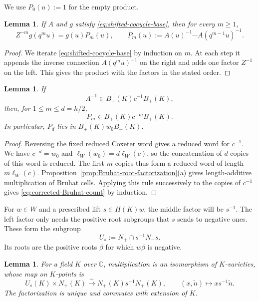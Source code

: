 \documentclass[11pt,leqno]{amsart}
\numberwithin{equation}{section}
\theoremstyle{plain}
\newtheorem{lemma}[theorem]{Lemma}
\theoremstyle{definition}
\theoremstyle{plain}
\theoremstyle{definition}
\theoremstyle{remark}
\begin{document}
We use $P_0(u):=1$ for the empty product.
\begin{lemma}\label{lem:shifted-cocycle-iteration}
If $A$ and $g$ satisfy \eqref{eq:shifted-cocycle-base}, then for every $m\ge1$,
\begin{equation}\label{eq:shifted-cocycle-corrected}
 Z^{-m}g(q^mu)
 =g(u)P_m(u),
 \qquad
 P_m(u):=A(u)^{-1}\cdots A(q^{m-1}u)^{-1}.
\end{equation}
\end{lemma}

\begin{proof}
We iterate \eqref{eq:shifted-cocycle-base} by induction on $m$.  At each step it appends the inverse connection $A(q^mu)^{-1}$ on the right and adds one factor $Z^{-1}$ on the left.  This gives the product with the factors in the stated order.
\end{proof}

\begin{lemma}\label{lem:corrected-Bruhat-count}
If
\[
 A^{-1}\in B_+(K)c^{-1}B_+(K),
\]
then, for $1\le m\le d=h/2$,
\begin{equation}\label{eq:corrected-Bruhat-count}
 P_m\in B_+(K)c^{-m}B_+(K).
\end{equation}
In particular, $P_d$ lies in $B_+(K)w_0B_+(K)$.
\end{lemma}

\begin{proof}
Reversing the fixed reduced Coxeter word gives a reduced word for $c^{-1}$.  We have $c^{-d}=w_0$ and $\ell_W(w_0)=d\ell_W(c)$, so the concatenation of $d$ copies of this word is reduced.  The first $m$ copies thus form a reduced word of length $m\ell_W(c)$.  Proposition~\ref{prop:Bruhat-root-factorization}(a) gives length-additive multiplication of Bruhat cells.  Applying this rule successively to the copies of $c^{-1}$ gives \eqref{eq:corrected-Bruhat-count} by induction.
\end{proof}

For $w\in W$ and a prescribed lift $s\in H(K)\dot w$, the middle factor will be $s^{-1}$.  The left factor only needs the positive root subgroups that $s$ sends to negative ones.  These form the subgroup
\[
 U_s:=N_+\cap s^{-1}N_-s.
\]
Its roots are the positive roots $\beta$ for which $w\beta$ is negative.
\begin{lemma}\label{lem:prescribed-Cartan-Bruhat-factorization}
For a field $K$ over $\mathbb C$, multiplication is an isomorphism of $K$-varieties, whose map on $K$-points is
\begin{equation}\label{eq:prescribed-Cartan-Bruhat-isomorphism}
 U_s(K)\times N_+(K)\xrightarrow{\sim}N_+(K)s^{-1}N_+(K),
 \qquad (x,\widetilde n)\longmapsto xs^{-1}\widetilde n.
\end{equation}
The factorization is unique and commutes with extension of $K$.
\end{lemma}
\end{document}
